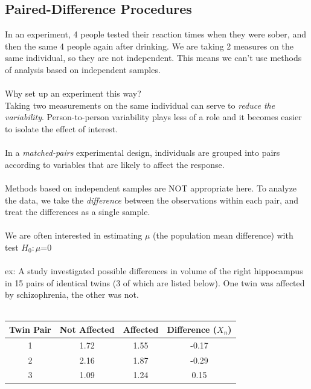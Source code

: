 \documentclass[12pt, a4paper]{article}
\begin{document}
	\subsection{Paired-Difference Procedures}
	In an experiment, 4 people tested their reaction times when they were sober, and then the same 4 people again after drinking. We are taking 2 measures on the same individual, so they are not independent. This means we can't use methods of analysis based on independent samples. \\~\\
	Why set up an experiment this way? \\
	Taking two measurements on the same individual can serve to \textit{reduce the variability}. Person-to-person variability plays less of a role and it becomes easier to isolate the effect of interest. \\~\\
	In a \textit{matched-pairs} experimental design, individuals are grouped into pairs according to variables that are likely to affect the response. \\~\\
	Methods based on independent samples are NOT appropriate here. To analyze the data, we take the \textit{difference} between the observations within each pair, and treat the differences as a single sample. \\~\\
	We are often interested in estimating $\mu$ (the population mean difference) with test $H_0: \mu$=0\\~\\
	ex: A study investigated possible differences in volume of the right hippocampus in 15 pairs of identical twins (3 of which are listed below). One twin was affected by schizophrenia, the other was not. \\~\\
	\begin{tabular}{ |c|c|c|c| }
		\hline
		Twin Pair & Not Affected & Affected & Difference ($X_n$) \\ \hline
		1 & 1.72 & 1.55 & -0.17 \\
		2 & 2.16 & 1.87 & -0.29 \\
		3 & 1.09 & 1.24 & 0.15 \\
		\hline
	\end{tabular} \\~\\
\end{document}
